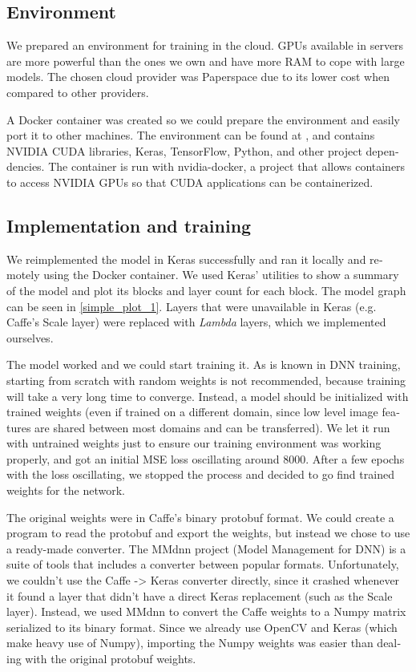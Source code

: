 \documentclass[12pt,openright,twoside,a4paper,english]{abntex2}
\begin{document}
\begin{otherlanguage}{english}
\subsection{Environment}

We prepared an environment for training in the cloud. GPUs available in servers are more powerful than the ones we own and have more RAM to cope with large models. The chosen cloud provider was Paperspace %
due to its lower cost when compared to other providers.

A Docker container was created so we could prepare the environment and easily port it to other machines. The environment can be found at , %
and contains NVIDIA CUDA libraries, Keras, TensorFlow, Python, and other project dependencies. The container is run with nvidia-docker, %
a project that allows containers to access NVIDIA GPUs so that CUDA applications can be containerized.

\subsection{Implementation and training}

We reimplemented the model in Keras successfully and ran it locally and remotely using the Docker container. We used Keras' utilities to show a summary of the model and plot its blocks and layer count for each block. The model graph can be seen in \ref{simple_plot_1}. Layers that were unavailable in Keras (e.g. Caffe's Scale layer) were replaced with \textit{Lambda} layers, which we implemented ourselves.

The model worked and we could start training it. As is known in DNN training, starting from scratch with random weights is not recommended, because training will take a very long time to converge. Instead, a model should be initialized with trained weights (even if trained on a different domain, since low level image features are shared between most domains and can be transferred). We let it run with untrained weights just to ensure our training environment was working properly, and got an initial MSE loss oscillating around 8000. After a few epochs with the loss oscillating, we stopped the process and decided to go find trained weights for the network.

The original weights were in Caffe's binary protobuf format. We could create a program to read the protobuf and export the weights, but instead we chose to use a ready-made converter. The MMdnn %
project (Model Management for DNN) is a suite of tools that includes a converter between popular formats. Unfortunately, we couldn't use the Caffe -> Keras converter directly, since it crashed whenever it found a layer that didn't have a direct Keras replacement (such as the Scale layer). Instead, we used MMdnn to convert the Caffe weights to a Numpy matrix serialized to its binary format. Since we already use OpenCV and Keras (which make heavy use of Numpy), importing the Numpy weights was easier than dealing with the original protobuf weights.


\end{otherlanguage}
\end{document}
